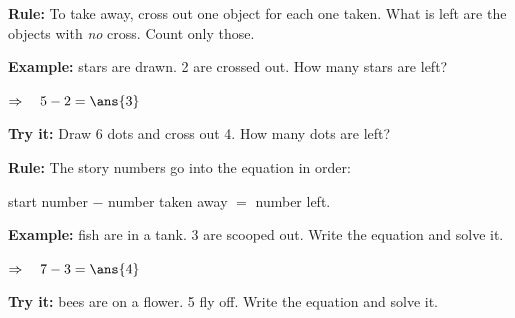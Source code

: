 \documentclass[12pt]{article}
\begin{document}


\begin{formulabox}
\textbf{Rule:} To take away, cross out one object for each one taken. What
is left are the objects with \emph{no} cross. Count only those.
\end{formulabox}

\begin{examplebox}
\textbf{Example:}  stars are drawn. 2 are crossed out. How many stars
are left?

$\Rightarrow\quad 5 - 2 = \ans{3}$
\end{examplebox}

\begin{tryitbox}
\textbf{Try it:} \quad Draw 6 dots and cross out 4. How many dots are
left?\\[2pt]
\end{tryitbox}


\begin{formulabox}
\textbf{Rule:} The story numbers go into the equation in order:\par
start number $-$ number taken away $=$ number left.
\end{formulabox}

\begin{examplebox}
\textbf{Example:}  fish are in a tank. 3 are scooped out. Write the
equation and solve it.

$\Rightarrow\quad 7 - 3 = \ans{4}$
\end{examplebox}

\begin{tryitbox}
\textbf{Try it:}  bees are on a flower. 5 fly off. Write the equation
and solve it.\\[2pt]
\end{tryitbox}
\end{document}

